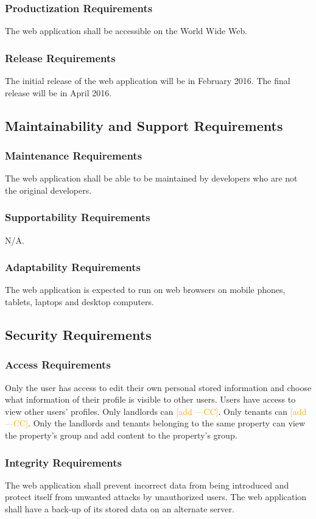 \documentclass[12pt, titlepage]{article}
\newcommand{\authornote}[3]{\textcolor{#1}{[#3 ---#2]}}
\newcommand{\authornote}[3]{}
\newcommand{\cc}[1]{\authornote{orange}{CC}{#1}}
\begin{document}
{\subsubsection{Productization Requirements}
The web application shall be accessible on the World Wide Web.
\subsubsection{Release Requirements}
The initial release of the web application will be in February 2016. The final release will be in April 2016.
\subsection{Maintainability and Support Requirements}
\subsubsection{Maintenance Requirements}
The web application shall be able to be maintained by developers who are not the original developers.
\subsubsection{Supportability Requirements}
N/A.
\subsubsection{Adaptability Requirements}
The web application is expected to run on web browsers on mobile phones, tablets, laptops and desktop computers.
\subsection{Security Requirements}
\subsubsection{Access Requirements}
Only the user has access to edit their own personal stored information and choose what information of their profile is visible to other users. Users have access to view other users' profiles. Only landlords can \cc{add}. Only tenants can \cc{add}. Only the landlords and tenants belonging to the same property can view the property's group and add content to the property's group.
\subsubsection{Integrity Requirements}
The web application shall prevent incorrect data from being introduced and protect itself from unwanted attacks by unauthorized users. The web application shall have a back-up of its stored data on an alternate server.
}
\end{document}
